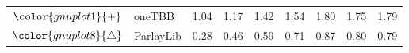 \begin{tabular}{clrrrrrrr}
\rowcolor{gnuplot1!10}$\color{gnuplot1}{+}$ & oneTBB & \cellcolor{gnuplot1!10} 1.04 & \cellcolor{gnuplot1!10} 1.17 & \cellcolor{gnuplot1!10} 1.42 & \cellcolor{gnuplot1!10} 1.54 & \cellcolor{gnuplot1!10} 1.80 & \cellcolor{gnuplot1!10} 1.75 & \cellcolor{gnuplot1!10} 1.79 \\
\rowcolor{gnuplot8!10}$\color{gnuplot8}{\triangle}$ & ParlayLib & \cellcolor{gnuplot8!10} 0.28 & \cellcolor{gnuplot8!10} 0.46 & \cellcolor{gnuplot8!10} 0.59 & \cellcolor{gnuplot8!10} 0.71 & \cellcolor{gnuplot8!10} 0.87 & \cellcolor{gnuplot8!10} 0.80 & \cellcolor{gnuplot8!10} 0.79 \\
\bottomrule
\end{tabular}
